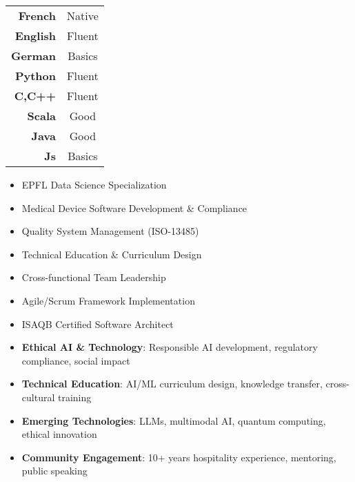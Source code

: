 
\threecolumnsection
{
\vspace{1em}
\hspace*{-5mm}\begin{tabular}{rc}
  \textbf{French}  & Native \\
  \textbf{English}   & Fluent \\
  \textbf{German} & Basics \\
  \textbf{Python} & Fluent \\
  \textbf{C,C++} & Fluent \\
  \textbf{Scala} & Good \\
  \textbf{Java} & Good \\
  \textbf{Js} & Basics
\end{tabular}
}
{
\vspace{1em}
\begin{itemize}
	\item EPFL Data Science Specialization
    \item Medical Device Software Development \& Compliance
    \item Quality System Management (ISO-13485)
    \item Technical Education \& Curriculum Design
    \item Cross-functional Team Leadership
    \item Agile/Scrum Framework Implementation
    \item ISAQB Certified Software Architect
\end{itemize}
}
{
\vspace{1em}
\hspace*{-5mm}\begin{itemize}
	\item \textbf{Ethical AI \& Technology}: Responsible AI development, regulatory compliance, social impact
	\item \textbf{Technical Education}: AI/ML curriculum design, knowledge transfer, cross-cultural training
    \item \textbf{Emerging Technologies}: LLMs, multimodal AI, quantum computing, ethical innovation
    \item \textbf{Community Engagement}: 10+ years hospitality experience, mentoring, public speaking
\end{itemize}
}